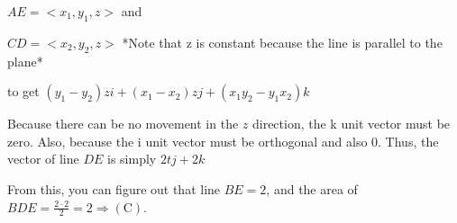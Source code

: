 \begin{enumerate}
 $AE=<x_1,y_1,z>$ and

 $CD=<x_2,y_2,z>$ *Note that z is constant because the line is parallel to the plane*

 to get $(y_1-y_2)zi+(x_1-x_2)zj+(x_1y_2-y_1x_2)k$

 Because there can be no movement in the $z$ direction, the k unit vector must be zero. Also, because the i unit vector must be orthogonal and also 0. Thus, the vector of line $DE$ is simply $2tj+2k$

 From this, you can figure out that line $BE=2$, and the area of $BDE=\frac{2\cdot2}{2}=2\Rightarrow \mathrm{(C)}$.

 


\end{enumerate}